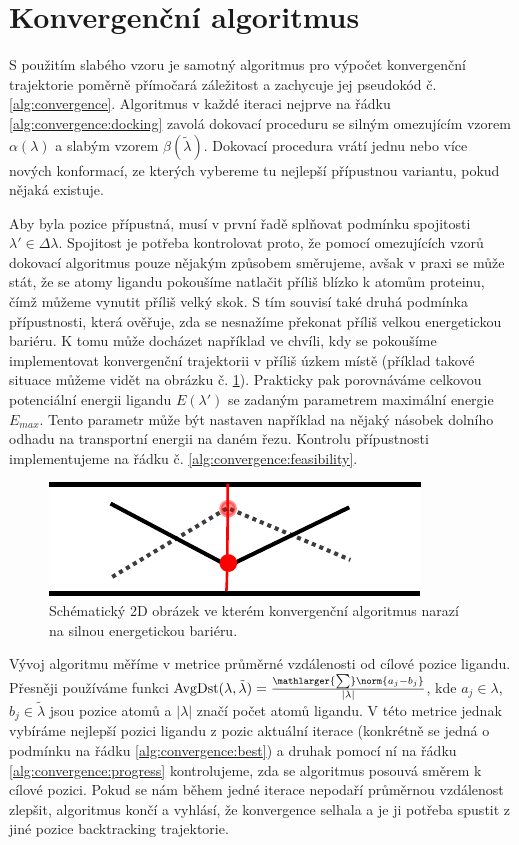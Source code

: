 \section{Konvergenční algoritmus} \label{subsec:convergence_algorithm}
S použitím slabého vzoru je samotný algoritmus pro výpočet konvergenční
trajektorie poměrně přímočará záležitost a zachycuje jej pseudokód č.
\ref{alg:convergence}. Algoritmus v každé iteraci nejprve na řádku
\ref{alg:convergence:docking} zavolá dokovací proceduru se silným omezujícím
vzorem $ \alpha(\lambda) $ a slabým vzorem $ \beta(\tilde{\lambda})$. Dokovací
procedura vrátí jednu nebo více nových konformací, ze kterých vybereme
tu nejlepší přípustnou variantu, pokud nějaká existuje.

Aby byla pozice přípustná,
musí v první řadě splňovat podmínku spojitosti $ \lambda' \in \Delta\lambda $.
Spojitost je potřeba kontrolovat proto, že pomocí omezujících vzorů dokovací algoritmus
pouze nějakým způsobem směrujeme, avšak v praxi se může stát, že se atomy ligandu
pokoušíme natlačit příliš blízko k atomům proteinu, čímž můžeme vynutit příliš
velký skok. S tím souvisí také druhá podmínka přípustnosti, která ověřuje, zda
se nesnažíme překonat příliš velkou energetickou bariéru. K tomu může docházet
například ve chvíli, kdy se pokoušíme implementovat konvergenční trajektorii
v příliš úzkem místě (příklad takové situace můžeme vidět na obrázku č.
\ref{fig:narrow_tunnel}). Prakticky pak porovnáváme celkovou potenciální energii
ligandu $ E(\lambda') $ se zadaným parametrem maximální energie $ E_{max} $.
Tento parametr může být nastaven například na nějaký násobek dolního odhadu na
transportní energii na daném řezu. Kontrolu přípustnosti implementujeme na řádku
č. \ref{alg:convergence:feasibility}.

\begin{figure}[ht]
\centering
\includegraphics[width=.5\hsize]{img/narrow_tunnel.pdf}
\caption{Schématický 2D obrázek ve kterém konvergenční algoritmus narazí na
silnou energetickou bariéru.}
\label{fig:narrow_tunnel}
\end{figure}

Vývoj algoritmu měříme v metrice průměrné vzdálenosti od cílové pozice
ligandu. Přesněji používáme funkci
$ \operatorname{AvgDst}(\lambda, \tilde{\lambda})
    = \frac{\mathlarger{\sum}\norm{a_j - b_j}}{|\lambda|} $, kde $ a_j \in \lambda $,
$ b_j \in \tilde{\lambda} $ jsou pozice atomů a $ |\lambda| $ značí počet atomů ligandu.
V této metrice jednak vybíráme nejlepší pozici ligandu z pozic aktuální iterace
(konkrétně se jedná o podmínku na řádku \ref{alg:convergence:best}) a druhak
pomocí ní na řádku \ref{alg:convergence:progress} kontrolujeme, zda se algoritmus
posouvá směrem k cílové pozici. Pokud se nám během jedné iterace nepodaří průměrnou
vzdálenost zlepšit, algoritmus končí a vyhlásí, že konvergence selhala a je ji
potřeba spustit z jiné pozice backtracking trajektorie.

